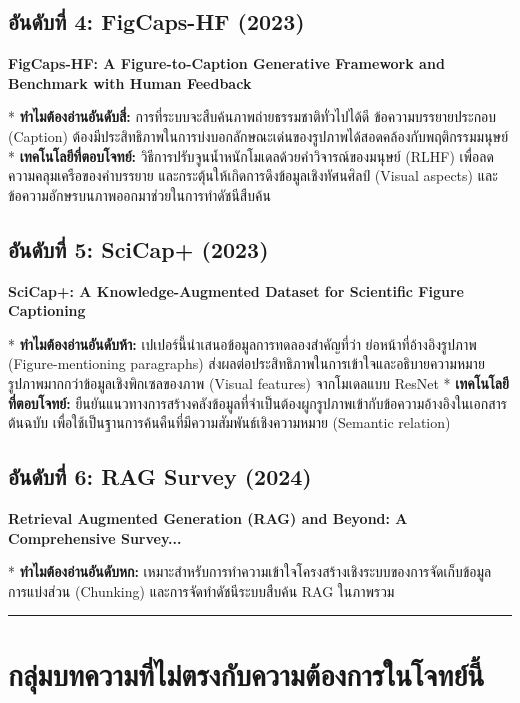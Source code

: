 \documentclass[10pt,a4paper]{article}
\begin{document}
\subsection*{อันดับที่ 4: FigCaps-HF (2023)}
\begin{highlight}
  \textbf{FigCaps-HF: A Figure-to-Caption Generative Framework and Benchmark with Human Feedback}
\end{highlight}
* \textbf{ทำไมต้องอ่านอันดับสี่:} การที่ระบบจะสืบค้นภาพถ่ายธรรมชาติทั่วไปได้ดี ข้อความบรรยายประกอบ (Caption) ต้องมีประสิทธิภาพในการบ่งบอกลักษณะเด่นของรูปภาพได้สอดคล้องกับพฤติกรรมมนุษย์
* \textbf{เทคโนโลยีที่ตอบโจทย์:} วิธีการปรับจูนน้ำหนักโมเดลด้วยคำวิจารณ์ของมนุษย์ (RLHF) เพื่อลดความคลุมเครือของคำบรรยาย และกระตุ้นให้เกิดการดึงข้อมูลเชิงทัศนศิลป์ (Visual aspects) และข้อความอักษรบนภาพออกมาช่วยในการทำดัชนีสืบค้น

\subsection*{อันดับที่ 5: SciCap+ (2023)}
\begin{highlight}
  \textbf{SciCap+: A Knowledge-Augmented Dataset for Scientific Figure Captioning}
\end{highlight}
* \textbf{ทำไมต้องอ่านอันดับห้า:} เปเปอร์นี้นำเสนอข้อมูลการทดลองสำคัญที่ว่า ย่อหน้าที่อ้างอิงรูปภาพ (Figure-mentioning paragraphs) ส่งผลต่อประสิทธิภาพในการเข้าใจและอธิบายความหมายรูปภาพมากกว่าข้อมูลเชิงพิกเซลของภาพ (Visual features) จากโมเดลแบบ ResNet
* \textbf{เทคโนโลยีที่ตอบโจทย์:} ยืนยันแนวทางการสร้างคลังข้อมูลที่จำเป็นต้องผูกรูปภาพเข้ากับข้อความอ้างอิงในเอกสารต้นฉบับ เพื่อใช้เป็นฐานการค้นคืนที่มีความสัมพันธ์เชิงความหมาย (Semantic relation)

\subsection*{อันดับที่ 6: RAG Survey (2024)}
\begin{highlight}
  \textbf{Retrieval Augmented Generation (RAG) and Beyond: A Comprehensive Survey...}
\end{highlight}
* \textbf{ทำไมต้องอ่านอันดับหก:} เหมาะสำหรับการทำความเข้าใจโครงสร้างเชิงระบบของการจัดเก็บข้อมูล การแบ่งส่วน (Chunking) และการจัดทำดัชนีระบบสืบค้น RAG ในภาพรวม

\vspace{12pt}
\noindent\rule{\textwidth}{0.4pt}

\section*{กลุ่มบทความที่ไม่ตรงกับความต้องการในโจทย์นี้}
\end{document}
